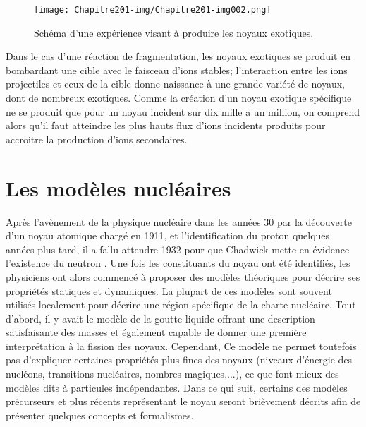  \begin{figure}[htb]
 	\texttt{[image: Chapitre201-img/Chapitre201-img002.png]}
 	\caption{Schéma d'une expérience visant à produire les noyaux exotiques.
}
 \end{figure}



Dans le cas d'une réaction de fragmentation, les noyaux exotiques se produit en bombardant une cible avec le faisceau
d'ions stables; l'interaction entre les ions projectiles et ceux de la cible donne naissance à une grande variété de
noyaux, dont de nombreux exotiques. Comme la création d'un noyau exotique spécifique ne se produit que pour un noyau
incident sur dix mille a un million, on comprend alors qu'il faut atteindre les plus hauts flux d'ions incidents
produits pour accroitre la production d'ions secondaires.
\section{Les modèles nucléaires}
 Après l'avènement de la physique nucléaire dans les années 30 par la découverte d'un noyau atomique chargé
en 1911, et l'identification du proton quelques années plus tard, il a fallu attendre 1932 pour que Chadwick mette en
évidence l'existence\textbf{ }du neutron . Une fois les constituants du noyau ont été identifiés, les physiciens ont
alors commencé à proposer des modèles théoriques pour décrire ses propriétés statiques et dynamiques. La plupart de ces
modèles sont souvent utilisés localement pour décrire une région spécifique de la charte nucléaire. Tout d'abord, il y
avait le modèle de la goutte liquide offrant une description satisfaisante des masses et également capable de donner
une première interprétation à la fission des noyaux. Cependant, Ce modèle ne permet toutefois pas d'expliquer certaines
propriétés plus fines des noyaux (niveaux d'énergie des nucléons, transitions nucléaires, nombres magiques,...), ce que
font mieux des modèles dits à particules indépendantes.
 Dans ce qui suit, certains des modèles précurseurs et plus récents représentant le noyau seront brièvement
décrits afin de présenter quelques concepts et formalismes.
